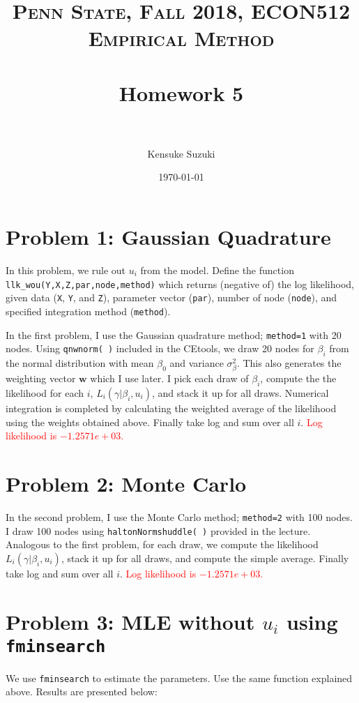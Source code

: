 \documentclass[11pt,letter]{article}
\title{	
\normalfont \normalsize 
\textsc{Penn State, Fall 2018, ECON512 Empirical Method} \\ [25pt] %
\horrule{0.5pt} \\[0.4cm] %
\huge Homework 5 \\ %
\horrule{2pt} \\[0.5cm] %
}
\author{Kensuke Suzuki} %
\date{\normalsize\today} %
\newcommand{\vect}[1]{\boldsymbol{\mathbf{#1}}}
\newcounter{lem}[section] \setcounter{lem}{0}
\newcommand{\code}[1]{\texttt{#1}}
\begin{document}
\maketitle %


\section*{Problem 1: Gaussian Quadrature}

In this problem, we rule out $u_i$ from the model. Define the function \code{llk\_wou(Y,X,Z,par,node,method)} which returns (negative of) the log likelihood, given data (\code{X}, \code{Y}, and \code{Z}), parameter vector (\code{par}), number of node (\code{node}), and specified integration method (\code{method}). 

In the first problem, I use the Gaussian quadrature method; \code{method=1} with 20 nodes. Using \code{qnwnorm( )} included in the CEtools, we draw 20 nodes for $\beta_i$ from the normal distribution with mean $\beta_0$ and variance $\sigma_\beta^2$. This also generates the weighting vector $\vect{w}$ which I use later. I pick each draw of $\beta_i$, compute the the likelihood for each $i$, $L_i(\gamma|\beta_i,u_i)$, and stack it up for all draws. Numerical integration is completed by calculating the weighted average of the likelihood  using the weights obtained above. Finally take log and sum over all $i$. \textcolor{red}{Log likelihood is $-1.2571e+03$.}

\section*{Problem 2: Monte Carlo}


In the second problem, I use the Monte Carlo method; \code{method=2} with 100 nodes. I draw 100 nodes using \code{haltonNormshuddle( )} provided in the lecture. Analogous to the first problem, for each draw, we compute the likelihood  $L_i(\gamma|\beta_i,u_i)$, stack it up for all draws, and compute the simple average. Finally take log and sum over all $i$. \textcolor{red}{Log likelihood is $-1.2571e+03$.}

\section*{Problem 3: MLE without $u_i$ using \code{fminsearch}}


We use \code{fminsearch} to estimate the parameters. Use the same function explained above.  Results are presented below:
\end{document}
